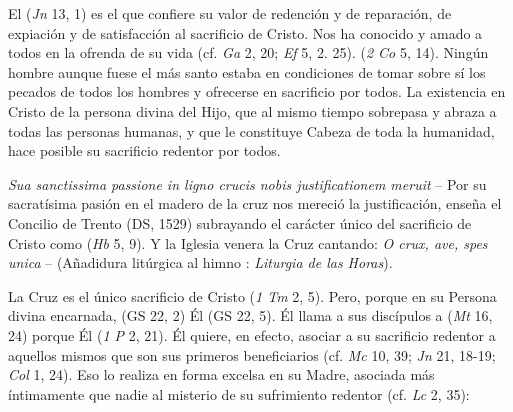 \begin{ccebody}
\newpage
{}

 El  (\textit{Jn} 13, 1) es el que confiere su valor de redención y de reparación, de expiación y de satisfacción al sacrificio de Cristo. Nos ha conocido y amado a todos en la ofrenda de su vida (cf. \textit{Ga} 2, 20; \textit{Ef} 5, 2. 25).  (\textit{2 Co} 5, 14). Ningún hombre aunque fuese el más santo estaba en condiciones de tomar sobre sí los pecados de todos los hombres y ofrecerse en sacrificio por todos. La existencia en Cristo de la persona divina del Hijo, que al mismo tiempo sobrepasa y abraza a todas las personas humanas, y que le constituye Cabeza de toda la humanidad, hace posible su sacrificio redentor por todos.

 \textit{Sua sanctissima passione in ligno crucis nobis justificationem meruit} – Por su sacratísima pasión en el madero de la cruz nos mereció la justificación, enseña el Concilio de Trento (DS, 1529) subrayando el carácter único del sacrificio de Cristo como  (\textit{Hb} 5, 9). Y la Iglesia venera la Cruz cantando: \textit{O crux, ave, spes unica} –  (Añadidura litúrgica al himno : \textit{Liturgia de las Horas}).


 La Cruz es el único sacrificio de Cristo  (\textit{1 Tm} 2, 5). Pero, porque en su Persona divina encarnada,  (GS 22, 2) Él  (GS 22, 5). Él llama a sus discípulos a  (\textit{Mt} 16, 24) porque Él  (\textit{1 P} 2, 21). Él quiere, en efecto, asociar a su sacrificio redentor a aquellos mismos que son sus primeros beneficiarios (cf. \textit{Mc} 10, 39; \textit{Jn} 21, 18-19; \textit{Col} 1, 24). Eso lo realiza en forma excelsa en su Madre, asociada más íntimamente que nadie al misterio de su sufrimiento redentor (cf. \textit{Lc} 2, 35):



\end{ccebody}
